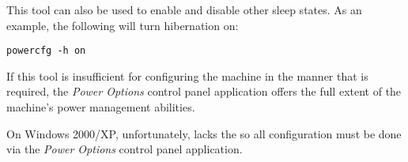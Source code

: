 This tool can also be used to enable and disable other sleep states.  As 
an example, the following will turn hibernation on:

\begin{verbatim}
powercfg -h on
\end{verbatim}

If this tool is insufficient for configuring the machine in the manner that 
is required, the \textit{Power Options} control panel application offers
the full extent of the machine's power management abilities.

On Windows 2000/XP, unfortunately, lacks the  so all 
configuration must be done via the \textit{Power Options} control panel 
application.
